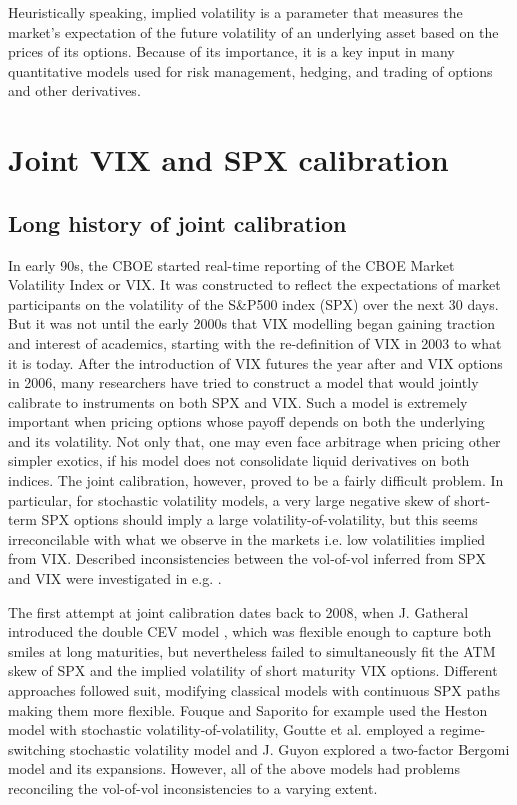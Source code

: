 Heuristically speaking, implied volatility is a parameter that measures the market's expectation of the future volatility of an underlying asset based on the prices of its options. Because of its importance, it is a key input in many quantitative models used for risk management, hedging, and trading of options and other derivatives.

\section{Joint VIX and SPX calibration}\label{sec:SPXnVIXintro}

\subsection{Long history of joint calibration}

In early 90s, the CBOE started real-time reporting of the CBOE Market Volatility Index or VIX. It was constructed to reflect the expectations of market participants on the volatility of the S\&P500 index (SPX) over the next 30 days. But it was not until the early 2000s that VIX modelling began gaining traction and interest of academics, starting with the re-definition of VIX in 2003 to what it is today. After the introduction of VIX futures the year after and VIX options in 2006, many researchers have tried to construct a model that would jointly calibrate to instruments on both SPX and VIX. Such a model is extremely important when pricing options whose payoff depends on both the underlying and its volatility. Not only that, one may even face arbitrage when pricing other simpler exotics, if his model does not consolidate liquid derivatives on both indices. The joint calibration, however, proved to be a fairly difficult problem. In particular, for stochastic volatility models, a very large negative skew of short-term SPX options should imply a large volatility-of-volatility, but this seems irreconcilable with what we observe in the markets i.e. low volatilities implied from VIX. Described inconsistencies between the vol-of-vol inferred from SPX and VIX were investigated in e.g. \cite{Song2012APrices, Jacquier2021RoughOptions}.

The first attempt at joint calibration dates back to 2008, when J. Gatheral introduced the double CEV model \cite{Gatheral2008ConsistentOptions}, which was flexible enough to capture both smiles at long maturities, but nevertheless failed to simultaneously fit the ATM skew of SPX and the implied volatility of short maturity VIX options. Different approaches followed suit, modifying classical models with continuous SPX paths making them more flexible. %
Fouque and Saporito \cite{Fouque2018HestonOptions} for example used the Heston model with stochastic volatility-of-volatility, Goutte et al. \cite{Goutte2017Regime-switchingOptions} employed a regime-switching stochastic volatility model and J. Guyon \cite{Guyon2017OnOptions, Guyon2020TheSkew} explored a two-factor Bergomi model and its expansions. However, all of the above models had problems reconciling the vol-of-vol inconsistencies to a varying extent.

